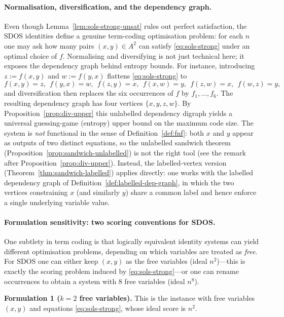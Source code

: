 \documentclass[11pt]{article}
\theoremstyle{plain}
\theoremstyle{definition}
\theoremstyle{definition}
\theoremstyle{remark}
\newcommand{\A}{A}
\begin{document}
\paragraph{Normalisation, diversification, and the dependency graph.}
Even though Lemma~\ref{lem:sols-strong-unsat} rules out perfect satisfaction, the SDOS identities define a genuine
term-coding optimisation problem: for each $n$ one may ask how many pairs $(x,y)\in\A^2$ can satisfy
\eqref{eq:sols-strong} under an optimal choice of $f$.
Normalising and diversifying is not just technical here; it exposes the dependency graph behind entropy bounds.
For instance, introducing $z:=f(x,y)$ and $w:=f(y,x)$ flattens \eqref{eq:sols-strong} to
\[
  f(x,y)=z,\ \ f(y,x)=w,\ \ f(z,y)=x,\ \ f(x,w)=y,\ \ f(z,w)=x,\ \ f(w,z)=y,
\]
and diversification then replaces the six occurrences of $f$ by $f_1,\dots,f_6$.
The resulting dependency graph has four vertices $\{x,y,z,w\}$.
By Proposition~\ref{prop:div-upper} this unlabelled dependency digraph yields a universal guessing-game (entropy)
upper bound on the maximum code size.
The system is \emph{not} functional in the sense of Definition~\ref{def:fnf}: both $x$ and $y$ appear as outputs of
two distinct equations, so the unlabelled sandwich theorem (Proposition~\ref{prop:sandwich-unlabelled}) is not the right tool
(see the remark after Proposition~\ref{prop:div-upper}).
Instead, the labelled-vertex version (Theorem~\ref{thm:sandwich-labelled}) applies directly: one works with the
labelled dependency graph of Definition~\ref{def:labelled-dep-graph}, in which the two vertices constraining $x$
(and similarly $y$) share a common label and hence enforce a single underlying variable value.

\paragraph{Formulation sensitivity: two scoring conventions for SDOS.}
One subtlety in term coding is that logically equivalent identity systems can yield different optimisation problems,
depending on which variables are treated as \emph{free}.
For SDOS one can either keep $(x,y)$ as the free variables (ideal $n^2$)---this is exactly the scoring problem
induced by \eqref{eq:sols-strong}---or one can rename occurrences to obtain a system with $8$ free variables (ideal
$n^8$).

\smallskip
\noindent\textbf{Formulation 1 ($k=2$ free variables).}
This is the instance with free variables $(x,y)$ and equations \eqref{eq:sols-strong}, whose ideal score is $n^2$.
\end{document}
